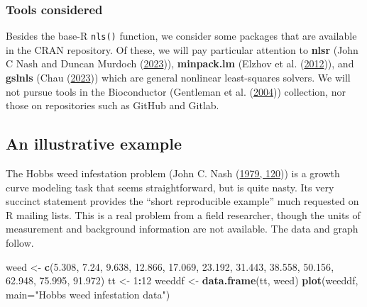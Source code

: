 \documentclass[
]{article}
\newenvironment{Shaded}{\begin{snugshade}}{\end{snugshade}}
\newcommand{\AttributeTok}[1]{\textcolor[rgb]{0.13,0.29,0.53}{#1}}
\newcommand{\DecValTok}[1]{\textcolor[rgb]{0.00,0.00,0.81}{#1}}
\newcommand{\FloatTok}[1]{\textcolor[rgb]{0.00,0.00,0.81}{#1}}
\newcommand{\FunctionTok}[1]{\textcolor[rgb]{0.13,0.29,0.53}{\textbf{#1}}}
\newcommand{\NormalTok}[1]{#1}
\newcommand{\OtherTok}[1]{\textcolor[rgb]{0.56,0.35,0.01}{#1}}
\newcommand{\SpecialCharTok}[1]{\textcolor[rgb]{0.81,0.36,0.00}{\textbf{#1}}}
\newcommand{\StringTok}[1]{\textcolor[rgb]{0.31,0.60,0.02}{#1}}
\begin{document}
\hypertarget{tools-considered}{%
\subsubsection{Tools considered}\label{tools-considered}}

Besides the base-R \texttt{nls()} function, we consider some packages
that are available in the CRAN repository. Of these, we will pay
particular attention to \textbf{nlsr} (John C Nash and Duncan Murdoch
(\protect\hyperlink{ref-nlsr2023manual}{2023})), \textbf{minpack.lm}
(Elzhov et al. (\protect\hyperlink{ref-minpacklm12}{2012})), and
\textbf{gslnls} (Chau (\protect\hyperlink{ref-gslnls23}{2023})) which
are general nonlinear least-squares solvers. We will not pursue tools in
the Bioconductor (Gentleman et al.
(\protect\hyperlink{ref-Bioconductor}{2004})) collection, nor those on
repositories such as GitHub and Gitlab.

\hypertarget{an-illustrative-example}{%
\subsection{An illustrative example}\label{an-illustrative-example}}

The Hobbs weed infestation problem (John C. Nash
(\protect\hyperlink{ref-cnm79}{1979, 120})) is a growth curve modeling
task that seems straightforward, but is quite nasty. Its very succinct
statement provides the ``short reproducible example'' much requested on
R mailing lists. This is a real problem from a field researcher, though
the units of measurement and background information are not available.
The data and graph follow.

\begin{Shaded}
\begin{Highlighting}[]
\NormalTok{weed }\OtherTok{\textless{}{-}} \FunctionTok{c}\NormalTok{(}\FloatTok{5.308}\NormalTok{, }\FloatTok{7.24}\NormalTok{, }\FloatTok{9.638}\NormalTok{, }\FloatTok{12.866}\NormalTok{, }\FloatTok{17.069}\NormalTok{, }\FloatTok{23.192}\NormalTok{, }\FloatTok{31.443}\NormalTok{,}
          \FloatTok{38.558}\NormalTok{, }\FloatTok{50.156}\NormalTok{, }\FloatTok{62.948}\NormalTok{, }\FloatTok{75.995}\NormalTok{, }\FloatTok{91.972}\NormalTok{)}
\NormalTok{tt }\OtherTok{\textless{}{-}} \DecValTok{1}\SpecialCharTok{:}\DecValTok{12}
\NormalTok{weeddf }\OtherTok{\textless{}{-}} \FunctionTok{data.frame}\NormalTok{(tt, weed)}
\FunctionTok{plot}\NormalTok{(weeddf, }\AttributeTok{main=}\StringTok{"Hobbs weed infestation data"}\NormalTok{)}
\end{Highlighting}
\end{Shaded}
\end{document}
